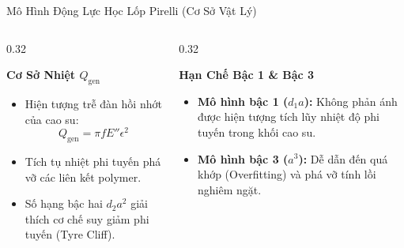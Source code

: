 \documentclass[aspectratio=169, 10pt]{beamer}
\begin{document}
\begin{frame}{Mô Hình Động Lực Học Lốp Pirelli (Cơ Sở Vật Lý)}
  \vspace{-0.1cm}
  \begin{center}
  \end{center}
  \vspace{-0.1cm}

  \begin{columns}[T]
    \begin{column}{0.32\textwidth}
      \begin{block}{\centering \textbf{Cơ Sở Nhiệt $Q_{\text{gen}}$}}
        \scriptsize
        \begin{itemize}
          \item Hiện tượng trễ đàn hồi nhớt của cao su:
          \[ Q_{\text{gen}} = \pi f E'' \epsilon^2 \]
          \item Tích tụ nhiệt phi tuyến phá vỡ các liên kết polymer.
          \item Số hạng bậc hai \textbf{$d_2 a^2$} giải thích cơ chế suy giảm phi tuyến (Tyre Cliff).
        \end{itemize}
      \end{block}
    \end{column}

    \begin{column}{0.32\textwidth}
      \begin{alertblock}{\centering \textbf{Hạn Chế Bậc 1 \& Bậc 3}}
        \scriptsize
        \begin{itemize}
          \item \textbf{Mô hình bậc 1 ($d_1 a$):} Không phản ánh được hiện tượng tích lũy nhiệt độ phi tuyến trong khối cao su.
          \item \textbf{Mô hình bậc 3 ($a^3$):} Dễ dẫn đến quá khớp (Overfitting) và phá vỡ tính lồi nghiêm ngặt.
        \end{itemize}
      \end{alertblock}
    \end{column}


\end{columns}
\end{frame}
\end{document}
